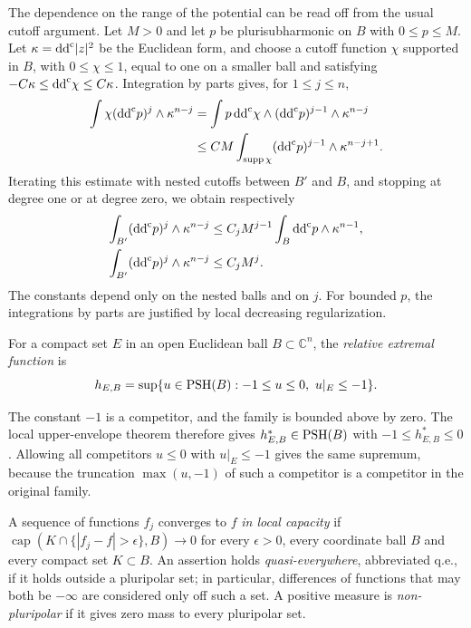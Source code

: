 The dependence on the range of the potential can be read off from the usual cutoff argument. Let $M>0$ and let $p$ be plurisubharmonic on $B$ with $0\leq p\leq M$. Let $\kappa=\mathrm{dd}^{\mathrm{c}}|z|^2$ be the Euclidean form, and choose a cutoff function $\chi$ supported in $B$, with $0\leq\chi\leq1$, equal to one on a smaller ball and satisfying $-C\kappa\leq\mathrm{dd}^{\mathrm{c}}\chi\leq C\kappa$. Integration by parts gives, for $1\leq j\leq n$,
\[
 \begin{split}
 \int\chi(\mathrm{dd}^{\mathrm{c}} p)^j\wedge\kappa^{n-j}
 &=\int p\,\mathrm{dd}^{\mathrm{c}}\chi\wedge(\mathrm{dd}^{\mathrm{c}} p)^{j-1}\wedge\kappa^{n-j}\\
 &\leq CM\int_{\operatorname{supp}\chi}(\mathrm{dd}^{\mathrm{c}} p)^{j-1}\wedge\kappa^{n-j+1}.
 \end{split}
\]
Iterating this estimate with nested cutoffs between $B'$ and $B$, and stopping at degree one or at degree zero, we obtain respectively
\begin{equation}\label{eq:local-cln-range}
 \begin{split}
 \int_{B'}(\mathrm{dd}^{\mathrm{c}} p)^j\wedge\kappa^{n-j}
 &\leq C_jM^{j-1}\int_B\mathrm{dd}^{\mathrm{c}} p\wedge\kappa^{n-1},\\
 \int_{B'}(\mathrm{dd}^{\mathrm{c}} p)^j\wedge\kappa^{n-j}
 &\leq C_jM^j.
 \end{split}
\end{equation}
The constants depend only on the nested balls and on $j$. For bounded $p$, the integrations by parts are justified by local decreasing regularization.

\begin{definition}\label{def:relative-extremal-function}
For a compact set $E$ in an open Euclidean ball $B\subset\mathbb C^n$, the \emph{relative extremal function} is
\[
 h_{E,B}=\sup\{u\in\PSH(B):-1\leq u\leq0,\ u|_E\leq-1\}.
\]
\end{definition}

The constant $-1$ is a competitor, and the family is bounded above by zero. The local upper-envelope theorem therefore gives $h_{E,B}^*\in\mathrm{PSH}(B)$ with $-1\leq h_{E,B}^*\leq0$. Allowing all competitors $u\leq0$ with $u|_E\leq-1$ gives the same supremum, because the truncation $\max(u,-1)$ of such a competitor is a competitor in the original family.

A sequence of functions $f_j$ converges to $f$ \emph{in local capacity} if $\operatorname{cap}(K\cap\{|f_j-f|>\epsilon\},B)\to0$ for every $\epsilon>0$, every coordinate ball $B$ and every compact set $K\subset B$. An assertion holds \emph{quasi-everywhere}, abbreviated q.e., if it holds outside a pluripolar set; in particular, differences of functions that may both be $-\infty$ are considered only off such a set. A positive measure is \emph{non-pluripolar} if it gives zero mass to every pluripolar set.

